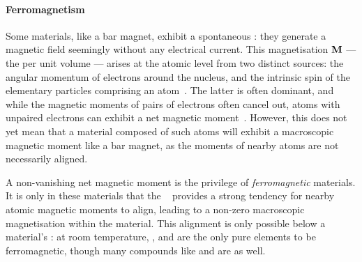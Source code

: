 \paragraph{Ferromagnetism}
Some materials, like a bar magnet, exhibit a spontaneous : they generate a magnetic field seemingly without any electrical current.
This magnetisation $\boldsymbol{\mathbf{M}}$ --- the  per unit volume --- arises at the atomic level from two distinct sources: the angular momentum of electrons around the nucleus, and the intrinsic spin of the elementary particles comprising an atom~\cite{coey2010magnetism}.
The latter is often dominant, and while the magnetic moments of pairs of electrons often cancel out, atoms with unpaired electrons can exhibit a net magnetic moment~\cite{PhD_Leliaert}. %
However, this does not yet mean that a material composed of such atoms will exhibit a macroscopic magnetic moment like a bar magnet, as the moments of nearby atoms are not necessarily aligned. \par
A non-vanishing net magnetic moment is the privilege of \emph{ferromagnetic} materials.
It is only in these materials that the ~\cite{heisenberg1928theorie} provides a strong tendency for nearby atomic magnetic moments to align, leading to a non-zero macroscopic magnetisation within the material.
This alignment is only possible below a material's : at room temperature, ,  and  are the only pure elements to be ferromagnetic, though many compounds like  and  are as well.

